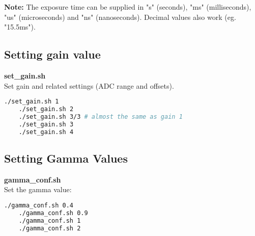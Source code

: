 \textbf{Note:} The exposure time can be supplied in "s" (seconds), "ms" (milliseconds), "us" (microseconds) and "ns" (nanoseconds). Decimal values also work (eg. "15.5ms"). 



\subsection{Setting gain value}

\textbf{set\_gain.sh}\\

Set gain and related settings (ADC range and offsets). 

\begin{lstlisting}[language=bash,morekeywords=$,keywordstyle=\bfseries,frame=none,xleftmargin=.25in,belowskip=2em]
    ./set_gain.sh 1 
    ./set_gain.sh 2
    ./set_gain.sh 3/3 # almost the same as gain 1
    ./set_gain.sh 3
    ./set_gain.sh 4
\end{lstlisting}



\subsection{Setting Gamma Values}

\textbf{gamma\_conf.sh}\\

Set the gamma value: 

\begin{lstlisting}[language=bash,morekeywords=$,keywordstyle=\bfseries,frame=none,xleftmargin=.25in,belowskip=2em]
    ./gamma_conf.sh 0.4
    ./gamma_conf.sh 0.9
    ./gamma_conf.sh 1
    ./gamma_conf.sh 2
\end{lstlisting}

